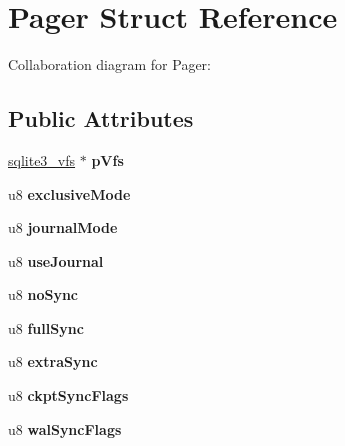 \hypertarget{structPager}{}\section{Pager Struct Reference}
\label{structPager}


Collaboration diagram for Pager\+:
\subsection*{Public Attributes}
\begin{DoxyCompactItemize}
\item 
\hyperlink{structsqlite3__vfs}{sqlite3\+\_\+vfs} $\ast$ {\bfseries p\+Vfs}\hypertarget{structPager_affa78e08a7f691a4c8f7043e0b4c9212}{}\label{structPager_affa78e08a7f691a4c8f7043e0b4c9212}

\item 
u8 {\bfseries exclusive\+Mode}\hypertarget{structPager_a5cbccc156e07d6226cb65a7ab05ac116}{}\label{structPager_a5cbccc156e07d6226cb65a7ab05ac116}

\item 
u8 {\bfseries journal\+Mode}\hypertarget{structPager_a9ad7bd09f1c9323d943ee17ddf42e46e}{}\label{structPager_a9ad7bd09f1c9323d943ee17ddf42e46e}

\item 
u8 {\bfseries use\+Journal}\hypertarget{structPager_af7783f866150d7e322c28cb324ad85d6}{}\label{structPager_af7783f866150d7e322c28cb324ad85d6}

\item 
u8 {\bfseries no\+Sync}\hypertarget{structPager_ae943093a3ccbfbf264ccf3c8a52edac1}{}\label{structPager_ae943093a3ccbfbf264ccf3c8a52edac1}

\item 
u8 {\bfseries full\+Sync}\hypertarget{structPager_abae5c9c3d85120ae266acc4c9a355b86}{}\label{structPager_abae5c9c3d85120ae266acc4c9a355b86}

\item 
u8 {\bfseries extra\+Sync}\hypertarget{structPager_a942f1ff74fbe690c2777d181c791589f}{}\label{structPager_a942f1ff74fbe690c2777d181c791589f}

\item 
u8 {\bfseries ckpt\+Sync\+Flags}\hypertarget{structPager_a4543ec92953e7bda49b3ed4f0bdab890}{}\label{structPager_a4543ec92953e7bda49b3ed4f0bdab890}

\item 
u8 {\bfseries wal\+Sync\+Flags}\hypertarget{structPager_aa8c8c2d893e4d2165f089ddde3e85103}{}\label{structPager_aa8c8c2d893e4d2165f089ddde3e85103}


\end{DoxyCompactItemize}

